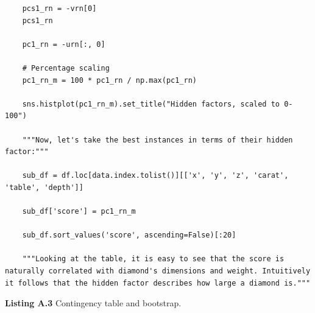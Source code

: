 \documentclass[12pt,a4paper]{article}
\begin{document}
\begin{lstlisting}
	pcs1_rn = -vrn[0]
	pcs1_rn
	
	pc1_rn = -urn[:, 0]
	
	# Percentage scaling
	pc1_rn_m = 100 * pc1_rn / np.max(pc1_rn)
	
	sns.histplot(pc1_rn_m).set_title("Hidden factors, scaled to 0-100")
	
	"""Now, let's take the best instances in terms of their hidden factor:"""
	
	sub_df = df.loc[data.index.tolist()][['x', 'y', 'z', 'carat', 'table', 'depth']]
	
	sub_df['score'] = pc1_rn_m
	
	sub_df.sort_values('score', ascending=False)[:20]
	
	"""Looking at the table, it is easy to see that the score is naturally correlated with diamond's dimensions and weight. Intuitively it follows that the hidden factor describes how large a diamond is."""
	\end{lstlisting}
	\newpage
	\begin{center}
		\noindent\textbf{Listing A.3} Contingency table and bootstrap.
	\end{center}
\end{document}
